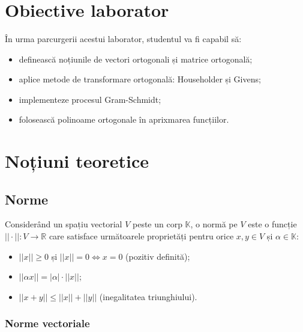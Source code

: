 \documentclass{exam}
\title{
\textmd{\textbf{\MNLabTitle}}
\author{}
\date{}
}
\begin{document}
\begin{coverpages}
	\maketitle
	\thispagestyle{empty}
	\tableofcontents
\end{coverpages}

\section{Obiective laborator}

În urma parcurgerii acestui laborator, studentul va fi capabil să:
\begin{itemize}
	\item definească noțiunile de vectori ortogonali și matrice ortogonală;
	\item aplice metode de transformare ortogonală: Householder și Givens;
	\item implementeze procesul Gram-Schmidt;
	\item folosească polinoame ortogonale în aprixmarea funcțiilor.
\end{itemize}

\section{Noțiuni teoretice}

\subsection{Norme}

Considerând un spațiu vectorial $V$ peste un corp $\mathbb{K}$, o normă pe
$V$ este o funcție $||\cdot||: V \rightarrow \mathbb{R}$ care satisface
următoarele proprietăți pentru orice $x, y \in V$ și $\alpha \in \mathbb{K}$:
\begin{itemize}
	\item $||x|| \geq 0$ și $||x|| = 0 \Leftrightarrow x = 0$ (pozitiv definită);
	\item $||\alpha x|| = |\alpha| \cdot ||x||$;
	\item $||x + y|| \leq ||x|| + ||y||$ (inegalitatea triunghiului).
\end{itemize}

\subsubsection{Norme vectoriale}
\end{document}
